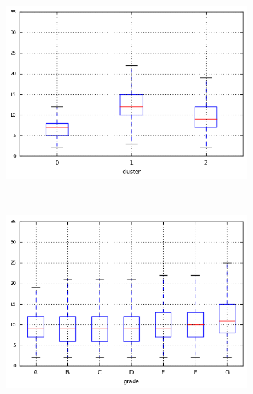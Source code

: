 \begin{anexosenv}
\begin{figure}[ht!]
\begin{subfigure}[t]{0.45\textwidth}
        \end{subfigure}
\end{figure}


\begin{figure}[t!]
    \centering
        \caption{\emph{Boxplots} de open\textunderscore acc }
        \begin{subfigure}[t]{0.45\textwidth}
            \centering

            \centerline{\includegraphics[width=1\textwidth]{img/open_acc_by_cluster}}
        \end{subfigure}%
        ~ 
        \begin{subfigure}[t]{0.45\textwidth}
            \centering
   
            \centerline{\includegraphics[width=1\textwidth]{img/open_acc_by_grade}}


\end{subfigure}
\end{figure}
\end{anexosenv}
